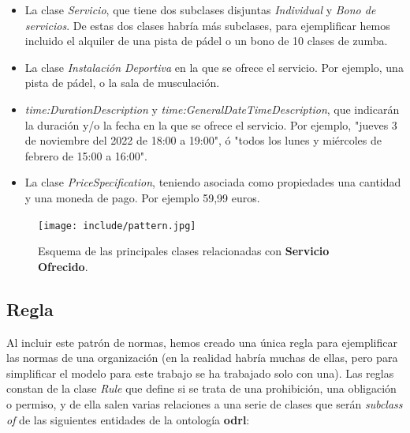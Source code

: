 \documentclass[a4paper,12pt]{article}
\begin{document}
	\begin{itemize}
		\item La clase \textit{Servicio}, que tiene dos subclases disjuntas \textit{Individual} y \textit{Bono de servicios}. De estas dos clases habría más subclases, para ejemplificar hemos incluido el alquiler de una pista de pádel o un bono de 10 clases de zumba.
		\item La clase \textit{Instalación Deportiva} en la que se ofrece el servicio. Por ejemplo, una pista de pádel, o la sala de musculación.
		\item \textit{time:DurationDescription} y \textit{time:GeneralDateTimeDescription}, que indicarán la duración y/o la fecha en la que se ofrece el servicio. Por ejemplo, "jueves 3 de noviembre del 2022 de 18:00 a 19:00", ó "todos los lunes y miércoles de febrero de 15:00 a 16:00".
		\item La clase \textit{PriceSpecification}, teniendo asociada como propiedades una cantidad y una moneda de pago. Por ejemplo 59,99 euros.
	\end{itemize}
	
	\begin{figure}[H]
		\centering
		\texttt{[image: include/pattern.jpg]}
		\caption{Esquema de las principales clases relacionadas con \textbf{Servicio Ofrecido}.}
	\end{figure}
	
	\subsection{Regla}
	
	Al incluir este patrón de normas, hemos creado una única regla para ejemplificar las normas de
	una organización (en la realidad habría muchas de ellas, pero para simplificar el modelo para este trabajo se ha trabajado solo con una). Las reglas constan de la clase \textit{Rule} que define si se trata de una prohibición, una obligación o permiso, y de ella salen varias relaciones a una serie de clases que serán \textit{subclass of} de las siguientes entidades de la ontología \textbf{odrl}:
	
\end{document}
